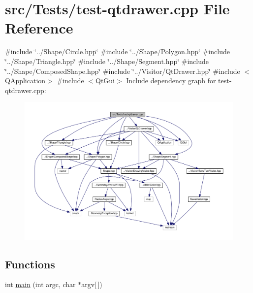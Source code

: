 \hypertarget{test-qtdrawer_8cpp}{}\section{src/\+Tests/test-\/qtdrawer.cpp File Reference}
\label{test-qtdrawer_8cpp}
{\ttfamily \#include \char`\"{}../\+Shape/\+Circle.\+hpp\char`\"{}}\newline
{\ttfamily \#include \char`\"{}../\+Shape/\+Polygon.\+hpp\char`\"{}}\newline
{\ttfamily \#include \char`\"{}../\+Shape/\+Triangle.\+hpp\char`\"{}}\newline
{\ttfamily \#include \char`\"{}../\+Shape/\+Segment.\+hpp\char`\"{}}\newline
{\ttfamily \#include \char`\"{}../\+Shape/\+Composed\+Shape.\+hpp\char`\"{}}\newline
{\ttfamily \#include \char`\"{}../\+Visitor/\+Qt\+Drawer.\+hpp\char`\"{}}\newline
{\ttfamily \#include $<$Q\+Application$>$}\newline
{\ttfamily \#include $<$Qt\+Gui$>$}\newline
Include dependency graph for test-\/qtdrawer.cpp\+:\nopagebreak
\begin{figure}[H]
\begin{center}
\leavevmode
\includegraphics[width=350pt]{test-qtdrawer_8cpp__incl}
\end{center}
\end{figure}
\subsection*{Functions}
\begin{DoxyCompactItemize}
\item 
int \hyperlink{test-qtdrawer_8cpp_a0ddf1224851353fc92bfbff6f499fa97}{main} (int argc, char $\ast$argv\mbox{[}$\,$\mbox{]})
\end{DoxyCompactItemize}


